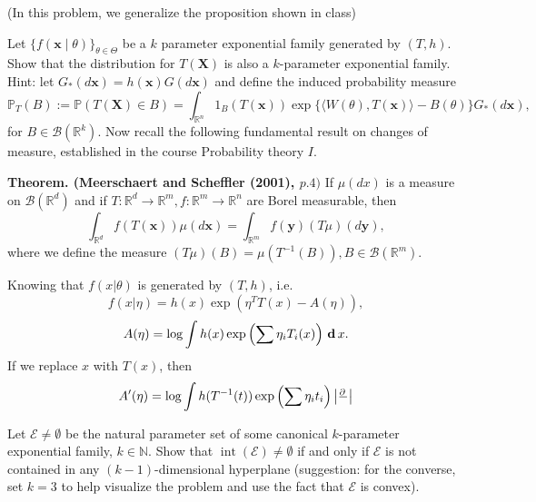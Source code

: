 \begin{exercise}
    (In this problem, we generalize the proposition shown in class) 
    
    Let \(\{f(\mathbf{x} \mid \theta)\}_{\theta \in \Theta}\) be a \(k\) parameter exponential family generated by \((T, h)\). Show that the distribution for \(T(\mathbf{X})\) is also a \(k\)-parameter exponential family. Hint: let \(G_{*}(d \mathbf{x})=h(\mathbf{x}) G(d \mathbf{x})\) and define the induced probability measure
    \[
        \mathbb{P}_{T}(B):=\mathbb{P}(T(\mathbf{X}) \in B)=\int_{\mathbb{R}^{n}} 1_{B}(T(\mathbf{x})) \exp \{\langle W(\theta), T(\mathbf{x})\rangle-B(\theta)\} G_{*}(d \mathbf{x}), 
    \]
    for \(B \in \mathcal{B}\left(\mathbb{R}^{k}\right)\). Now recall the following fundamental result on changes of measure, established in the course Probability theory \(I\). 

    {\bfseries Theorem. (Meerschaert and Scheffler (2001), \(p .4)\)} If \(\mu(d x)\) is a measure on \(\mathcal{B}\left(\mathbb{R}^{d}\right)\) and if \(T: \mathbb{R}^{d} \rightarrow \mathbb{R}^{m}, f: \mathbb{R}^{m} \rightarrow \mathbb{R}^{n}\) are Borel measurable, then
    \[
        \int_{\mathbb{R}^{d}} f(T(\boldsymbol{x})) \mu(d \boldsymbol{x})=\int_{\mathbb{R}^{m}} f(\boldsymbol{y})(T \mu)(d \boldsymbol{y}),
    \]
    where we define the measure \((T \mu)(B)=\mu\left(T^{-1}(B)\right), B \in \mathcal{B}\left(\mathbb{R}^{m}\right)\). 
\end{exercise}

\begin{solution}
    Knowing that $f(x|\theta)$ is generated by $(T,h)$, i.e. 
    \[
        f(x|\eta)=h(x)\exp\left(\eta^TT(x)-A(\eta)\right), 
    \]
    \[
        A(\eta)=\log\int h(x)\exp\left(\sum\eta_iT_i(x)\right) \,\mathbf{d}\, x. 
    \]
    If we replace $x$ with $T(x)$, then 
    \[
        A'(\eta)=\log\int h(T^{-1}(t))\exp\left(\sum\eta_it_i\right)\left|\begin{matrix}
            \frac{\partial\, }{}
        \end{matrix}\right|
    \]
\end{solution}

\begin{exercise}
    Let \(\mathcal{E} \neq \emptyset\) be the natural parameter set of some canonical \(k\)-parameter exponential family, \(k \in \mathbb{N}\). Show that \(\operatorname{int}(\mathcal{E}) \neq \emptyset\) if and only if \(\mathcal{E}\) is not contained in any \((k-1)\)-dimensional hyperplane (suggestion: for the converse, set \(k=3\) to help visualize the problem and use the fact that \(\mathcal{E}\) is convex).
\end{exercise}

